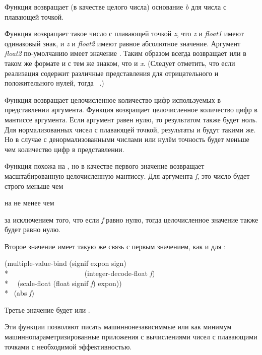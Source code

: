 \begin{defun}[Функция]
Функция  возвращает (в качестве целого числа)
основание \emph{b} для числа с плавающей точкой.

Функция  возвращает такое число с плавающей точкой \emph{z}, что
\emph{z} и \emph{float1} имеют одинаковый знак, и \emph{z} и \emph{float2} имеют
равное абсолютное значение.
Аргумент \emph{float2} по-умолчанию имеет значение .
Таким образом  всегда возвращает  или  в
таком же формате и с тем же знаком, что и \emph{x}. (Следует отметить, что если
реализация содержит различные представления для отрицательного и положительного
нулей, тогда  \EV\ .)

Функция  возвращает целочисленное количество
цифр используемых в представлении аргумента. Функция 
возвращает целочисленное количество цифр в мантиссе аргумента. Если аргумент
равен нулю, то результатом также будет ноль.
Для нормализованных чисел с плавающей точкой, результаты  и
 будут такими же. Но в случае с денормализованными числами
или нулём точность будет меньше чем количество цифр в представлении.

Функция  похожа на , но в качестве
первого значение возвращает масштабированную целочисленную мантиссу.
Для аргумента \emph{f}, это число будет строго меньше чем
\begin{lisp}
\end{lisp}
на не менее чем 
\begin{lisp}
\end{lisp}
за исключением того, что если \emph{f} равно нулю, тогда целочисленное значение
также будет равно нулю.

Второе значение имеет такую же связь с первым значением, как и для
: 
\begin{lisp}
(multiple-value-bind (signif expon sign) \\*
~~~~~~~~~~~~~~~~~~~~~(integer-decode-float \emph{f}) \\*
~~(scale-float (float signif \emph{f}) expon)) \\*
\EQ\ (abs \emph{f})
\end{lisp}

Третье значение  будет  или .

\beforenoterule
\begin{rationale}
Эти функции позволяют писать машиннонезависиммые или как минимум
машиннопараметризированные приложения с вычислениями чисел с плавающими точками
с необходимой эффективностью.
\end{rationale}
\afternoterule
\end{defun}

